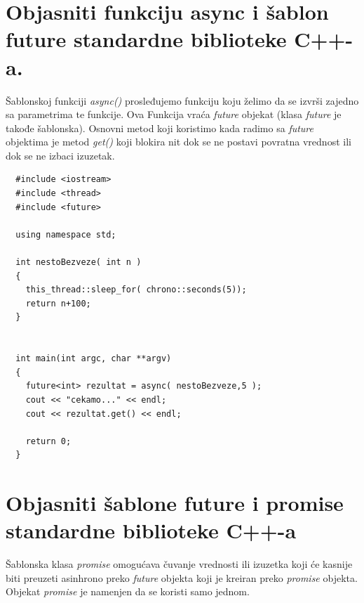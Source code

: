\documentclass[a4paper]{article}
\begin{document}
\section{Objasniti funkciju async i šablon future standardne biblioteke C++-a.}
  Šablonskoj funkciji \textit{async()} prosleđujemo funkciju koju želimo da se izvrši
  zajedno sa parametrima te funkcije. Ova Funkcija vraća \textit{future} objekat 
  (klasa \textit{future} je takođe šablonska). Osnovni metod koji koristimo kada 
  radimo sa \textit{future} objektima je metod \textit{get()} koji blokira nit
  dok se ne postavi povratna vrednost ili dok se ne izbaci izuzetak. 
  \cite{cppref_async} \cite{cppref_future}

\begin{lstlisting}
  #include <iostream>
  #include <thread>
  #include <future>
  
  using namespace std;
  
  int nestoBezveze( int n )
  {
    this_thread::sleep_for( chrono::seconds(5));
    return n+100;
  }
  
  
  int main(int argc, char **argv)
  {
    future<int> rezultat = async( nestoBezveze,5 );
    cout << "cekamo..." << endl;
    cout << rezultat.get() << endl;
    
    return 0;
  }\end{lstlisting}  

\newpage
\section{Objasniti šablone future i promise standardne biblioteke C++-a}
  Šablonska klasa \textit{promise} omogućava čuvanje vrednosti ili izuzetka koji će
  kasnije biti preuzeti asinhrono preko \textit{future} objekta koji je kreiran preko
  \textit{promise} objekta. Objekat \textit{promise} je namenjen da se koristi samo jednom.
  \cite{cppref_promise}
\end{document}

